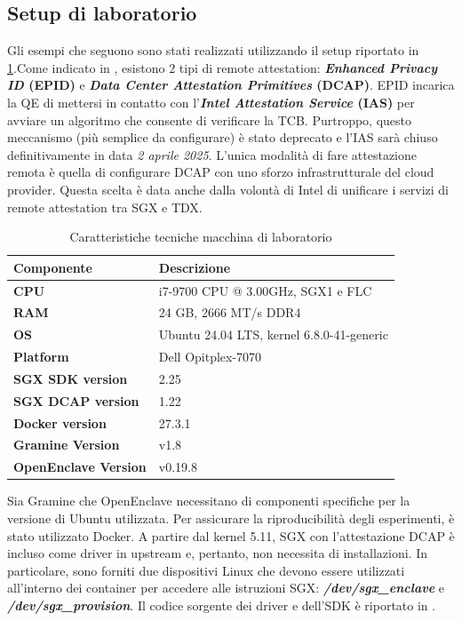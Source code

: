 \documentclass{article}
\begin{document}
\subsection{Setup di laboratorio}
Gli esempi che seguono sono stati realizzati utilizzando il setup riportato in \cref{tab:lab-spec}.Come indicato in , esistono $2$ tipi di remote attestation: \textbf{\textit{Enhanced Privacy ID} (EPID)} e \textbf{\textit{Data Center Attestation Primitives} (DCAP)}. EPID incarica la QE di mettersi in contatto con l'\textbf{\textit{Intel Attestation Service} (IAS)} per avviare un algoritmo che consente di verificare la TCB. Purtroppo, questo meccanismo (più semplice da configurare) è stato deprecato e l'IAS sarà chiuso definitivamente in data \textit{2 aprile 2025}. L'unica modalità di fare attestazione remota è quella di configurare DCAP con uno sforzo infrastrutturale del cloud provider. Questa scelta è data anche dalla volontà di Intel di unificare i servizi di remote attestation tra SGX e TDX.

\begin{table}[h]
\centering
\begin{tabular}{|l|p{7cm}|}
\hline
 Componente & Descrizione \\ \hline
\textbf{CPU} & i7-9700 CPU @ 3.00GHz, SGX1 e FLC  \\ \hline
\textbf{RAM} & 24 GB, 2666 MT/s DDR4 \\ \hline
\textbf{OS} & Ubuntu 24.04 LTS, kernel 6.8.0-41-generic \\ \hline
\textbf{Platform} & Dell Opitplex-7070 \\ \hline
\textbf{SGX SDK version} & 2.25 \\ \hline
\textbf{SGX DCAP version} & 1.22 \\ \hline
\textbf{Docker version} & 27.3.1 \\ \hline
\textbf{Gramine Version} & v1.8 \\ \hline
\textbf{OpenEnclave Version} & v0.19.8 \\ \hline
\end{tabular}
\caption{Caratteristiche tecniche macchina di laboratorio}
\label{tab:lab-spec}
\end{table}

Sia Gramine che OpenEnclave necessitano di componenti specifiche per la versione di Ubuntu utilizzata. Per assicurare la riproducibilità degli esperimenti, è stato utilizzato Docker. A partire dal kernel 5.11, SGX con l'attestazione DCAP è incluso come driver in upstream e, pertanto, non necessita di installazioni. In particolare, sono forniti due dispositivi Linux che devono essere utilizzati all'interno dei container per accedere alle istruzioni SGX: \textbf{\textit{/dev/sgx\_enclave}} e \textbf{\textit{/dev/sgx\_provision}}. Il codice sorgente dei driver e dell'SDK è riportato in \cite{linux-sgx}.
\end{document}
